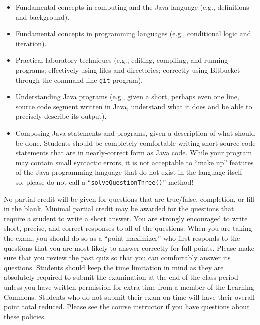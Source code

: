 \vspace*{-.05in}
\begin{itemize}

  \itemsep 0in

  \item Fundamental concepts in computing and the Java language (e.g., definitions and background).

  \item Fundamental concepts in programming languages (e.g., conditional logic and iteration).

  \item Practical laboratory techniques (e.g., editing, compiling, and running programs; effectively using files and
    directories; correctly using Bitbucket through the command-line {\tt git} program).

  \item Understanding Java programs (e.g., given a short, perhaps even one line, source code segment written in Java,
    understand what it does and be able to precisely describe its output).

  \item Composing Java statements and programs, given a description of what should be done. Students should be completely
    comfortable writing short source code statements that are in nearly-correct form as Java code. While your program may
    contain small syntactic errors, it is not acceptable to ``make up'' features of the Java programming language that do
    not exist in the language itself---so, please do not call a ``{\tt solveQuestionThree()}'' method!

\end{itemize}

\noindent No partial credit will be given for questions that are true/false, completion, or fill in the blank. Minimal
partial credit may be awarded for the questions that require a student to write a short answer. You are strongly
encouraged to write short, precise, and correct responses to all of the questions. When you are taking the exam, you
should do so as a ``point maximizer'' who first responds to the questions that you are most likely to answer correctly
for full points. Please make sure that you review the past quiz so that you can comfortably answer its questions.
Students should keep the time limitation in mind as they are absolutely required to submit the examination at the end of
the class period unless you have written permission for extra time from a member of the Learning Commons.  Students who
do not submit their exam on time will have their overall point total reduced.  Please see the course instructor if you
have questions about these policies.

